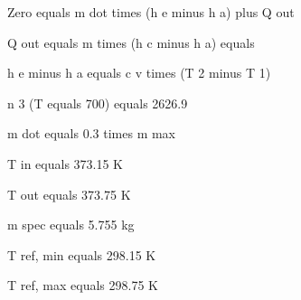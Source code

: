 Zero equals m dot times (h e minus h a) plus Q out

Q out equals m times (h c minus h a) equals

h e minus h a equals c v times (T 2 minus T 1)

n 3 (T equals 700) equals 2626.9

m dot equals 0.3 times m max

T in equals 373.15 K

T out equals 373.75 K

m spec equals 5.755 kg

T ref, min equals 298.15 K

T ref, max equals 298.75 K